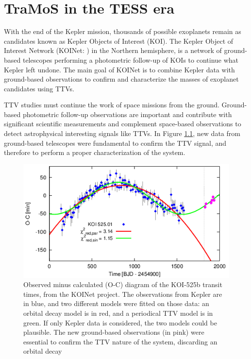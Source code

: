 \chapter{TraMoS in the TESS era}\label{chap:tess}

With the end of the Kepler mission, thousands of possible exoplanets remain as candidates known as Kepler Objects of Interest (KOI). The Kepler Object of Interest Network (KOINet: \citep{vonEssen2018,Freuddenthal2018}) in the Northern hemisphere, is a network of ground-based telescopes performing a photometric follow-up of KOIs to continue what Kepler left undone. The main goal of KOINet is to combine Kepler data with ground-based observations to confirm and characterize the masses of exoplanet candidates using TTVs.

TTV studies must continue the work of space missions from the ground. Ground-based photometric follow-up observations are important and contribute with significant scientific measurements and complement space-based observations to detect astrophysical interesting signals like TTVs. In Figure \ref{koinet}, new data from ground-based telescopes were fundamental to confirm the TTV signal, and therefore to perform a proper characterization of the system.

\begin{figure}
\centering
\includegraphics[width=0.8\columnwidth]{imagenes/koinet.png}
\caption{Observed minus calculated (O-C) diagram of the KOI-525b transit times, from the KOINet project. The observations from Kepler are in blue, and two different models were fitted on those data: an orbital decay model is in red, and a periodical TTV model is in green. If only Kepler data is considered, the two models could be plausible. The new ground-based observations (in pink) were essential to confirm the TTV nature of the system, discarding an orbital decay}
\label{koinet}
\end{figure}

